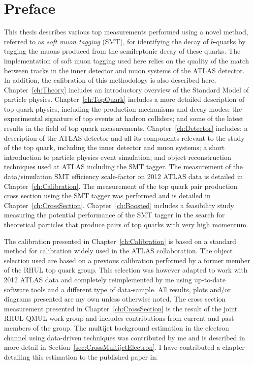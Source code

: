 \thispagestyle{empty}
\vspace{1cm}
\chapter*{Preface}
This thesis describes various top measurements performed using a novel method, referred to as \emph{soft muon tagging} (SMT), for identifying the decay of $b$-quarks by tagging the muons produced from the semileptonic decay of these quarks. The implementation of soft muon tagging used here relies on the quality of the match between tracks in the inner detector and muon systems of the ATLAS detector. In addition, the calibration of this methodology is also described here.
Chapter~\ref{ch:Theory} includes an introductory overview of the Standard Model of particle physics. Chapter~\ref{ch:TopQuark} includes a more detailed description of top quark physics, including the production mechanisms and decay modes; the experimental signature of top events at hadron colliders; and some of the latest results in the field of top quark measurements. Chapter~\ref{ch:Detector} includes: a description of the ATLAS detector and all its components relevant to the study of the top quark, including the inner detector and muon systems; a short introduction to particle physics event simulation; and object reconstruction techniques used at ATLAS including the SMT tagger. The measurement of the data/simulation SMT efficiency scale-factor on 2012 ATLAS data is detailed in Chapter~\ref{ch:Calibration}. The measurement of the top quark pair production cross section using the SMT tagger was performed and is detailed in Chapter~\ref{ch:CrossSection}. Chapter~\ref{ch:Boosted} includes a feasibility study measuring the potential performance of the SMT tagger in the search for theoretical particles that produce pairs of top quarks with very high momentum.

The calibration presented in Chapter~\ref{ch:Calibration} is based on a standard method for calibration widely used in the ATLAS collaboration. The object selection used are based on a previous calibration performed by a former member of the RHUL top quark group. This selection was however adapted to work with 2012 ATLAS data and completely reimplemented by me using up-to-date software tools and a different type of data-sample. All results, plots and/or diagrams presented are my own unless otherwise noted. The cross section measurement presented in Chapter~\ref{ch:CrossSection} is the result of the joint RHUL-QMUL work group and includes contributions from current and past members of the group. The multijet background estimation in the electron channel using data-driven techniques was contributed by me and is described in more detail in Section~\ref{sec:CrossMultijetElectron}. I have contributed a chapter detailing this estimation to the published paper in:

